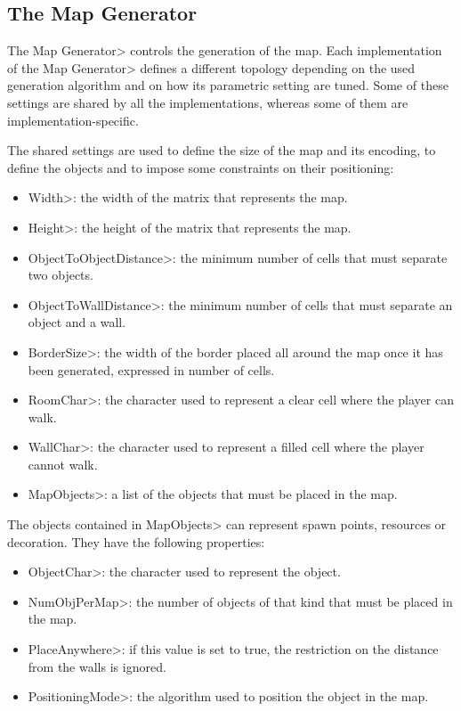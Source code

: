 \subsection{The Map Generator}

The \<Map Generator> controls the generation of the map. Each implementation of the \<Map Generator> defines a different topology depending on the used generation algorithm and on how its parametric setting are tuned. Some of these settings are shared by all the implementations, whereas some of them are implementation-specific.

\par

The shared settings are used to define the size of the map and its encoding, to define the objects and to impose some constraints on their positioning:

\begin{itemize}
\item \<Width>: the width of the matrix that represents the map.
\item \<Height>: the height of the matrix that represents the map.
\item \<ObjectToObjectDistance>: the minimum number of cells that must separate two objects. 
\item \<ObjectToWallDistance>: the minimum number of cells that must separate an object and a wall.
\item \<BorderSize>: the width of the border placed all around the map once it has been generated, expressed in number of cells.
\item \<RoomChar>: the character used to represent a clear cell where the player can walk.
\item \<WallChar>: the character used to represent a filled cell where the player cannot walk.
\item \<MapObjects>: a list of the objects that must be placed in the map.
\end{itemize}

The objects contained in \<MapObjects> can represent spawn points, resources or decoration. They have the following properties:

\begin{itemize}
\item \<ObjectChar>: the character used to represent the object.
\item \<NumObjPerMap>: the number of objects of that kind that must be placed in the map.
\item \<PlaceAnywhere>: if this value is set to true, the restriction on the distance from the walls is ignored.
\item \<PositioningMode>: the algorithm used to position the object in the map.
\end{itemize}

